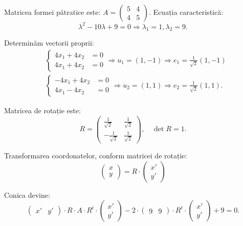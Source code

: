 Matricea formei pătratice este: $A = \begin{pmatrix} 5 & 4 \\ 4 & 5 \end{pmatrix}$.
Ecuația caracteristică:
\[
  \lambda^2 - 10\lambda + 9 = 0 \Rightarrow \lambda_1 = 1, \lambda_2 = 9.
\]

Determinăm vectorii proprii:
\begin{align*}
  & \begin{cases}
    4x_1 + 4x_2 &= 0 \\
    4x_1 + 4x_2 &= 0
  \end{cases} \Rightarrow u_1 = (1, -1) \Rightarrow e_1 = \frac{1}{\sqrt{2}} (1, -1) \\
  & \begin{cases}
    -4x_1 + 4x_2 &= 0 \\
    4x_1 - 4x_2 &= 0
  \end{cases} \Rightarrow u_2 = (1, 1) \Rightarrow e_2 = \frac{1}{\sqrt{2}} (1, 1).
\end{align*}

Matricea de rotație este:
\[
  R = \begin{pmatrix}
    \frac{1}{\sqrt{2}} & \frac{1}{\sqrt{2}} \\
    -\frac{1}{\sqrt{2}} & \frac{1}{\sqrt{2}}
  \end{pmatrix}, \quad \det R = 1.
\]

Transformarea coordonatelor, conform matricei de rotație:
\[
  \begin{pmatrix}
    x \\ y
  \end{pmatrix} = R \cdot \begin{pmatrix} x' \\ y' \end{pmatrix}
\]

Conica devine:
\[
  \begin{pmatrix}
    x' & y'
  \end{pmatrix} \cdot R \cdot A \cdot R^t \cdot
  \begin{pmatrix}
    x' \\ y'
  \end{pmatrix} - 2 \cdot
  \begin{pmatrix}
    9 & 9 
  \end{pmatrix} \cdot R^t \cdot
  \begin{pmatrix}
    x' \\ y'
  \end{pmatrix} + 9 = 0.
\]

